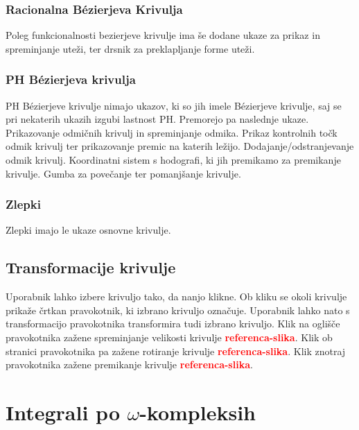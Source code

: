 \documentclass[isrm2, tisk]{fmfdelo}
\newcommand{\mycomment}[1]{\textbf{\textcolor{red}{#1}}}
\newcommand{\missingref}[1]{\mycomment{referenca-#1}}
\begin{document}
    \subsubsection{Racionalna Bézierjeva Krivulja}
    Poleg funkcionalnosti bezierjeve krivulje ima še dodane ukaze za prikaz in spreminjanje uteži, ter drsnik za preklapljanje forme uteži.

    \subsubsection{PH Bézierjeva krivulja}
    PH Bézierjeve krivulje nimajo ukazov, ki so jih imele Bézierjeve krivulje, saj se pri nekaterih ukazih izgubi lastnost PH.
    Premorejo pa naslednje ukaze.
    Prikazovanje odmičnih krivulj in spreminjanje odmika.
    Prikaz kontrolnih točk odmik krivulj ter prikazovanje premic na katerih ležijo.
    Dodajanje/odstranjevanje odmik krivulj.
    Koordinatni sistem s hodografi, ki jih premikamo za premikanje krivulje.
    Gumba za povečanje ter pomanjšanje krivulje.

    \subsubsection{Zlepki}
    Zlepki imajo le ukaze osnovne krivulje.

    \subsection{Transformacije krivulje}
    Uporabnik lahko izbere krivuljo tako, da nanjo klikne.
    Ob kliku se okoli krivulje prikaže črtkan pravokotnik, ki izbrano krivuljo označuje.
    Uporabnik lahko nato s transformacijo pravokotnika transformira tudi izbrano krivuljo.
    Klik na oglišče pravokotnika zažene spreminjanje velikosti krivulje \missingref{slika}.
    Klik ob stranici pravokotnika pa zažene rotiranje krivulje \missingref{slika}.
    Klik znotraj pravokotnika zažene premikanje krivulje \missingref{slika}.


    \section{Integrali po \texorpdfstring{$\omega$}{ω}-kompleksih}
\end{document}
